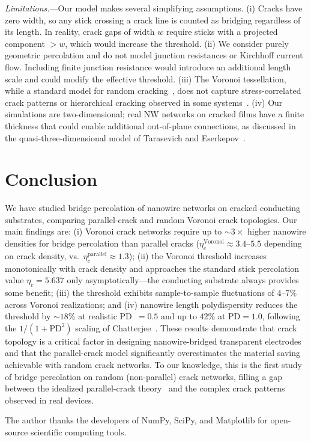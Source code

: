 \textit{Limitations.}---Our model makes several simplifying
assumptions.
(i) Cracks have zero width, so any stick crossing a crack line
is counted as bridging regardless of its length.
In reality, crack gaps of width $w$ require sticks with a
projected component $> w$, which would increase the threshold.
(ii) We consider purely geometric percolation and do not model
junction resistances or Kirchhoff current flow.
Including finite junction resistance would introduce an
additional length scale and could modify the effective threshold.
(iii) The Voronoi tessellation, while a standard model for
random cracking~\cite{Tarasevich2023}, does not capture
stress-correlated crack patterns or hierarchical cracking
observed in some systems~\cite{Bohn2005}.
(iv) Our simulations are two-dimensional; real NW networks on
cracked films have a finite thickness that could enable
additional out-of-plane connections, as discussed in the
quasi-three-dimensional model of
Tarasevich and Eserkepov~\cite{Tarasevich2026}.

\section{Conclusion}

We have studied bridge percolation of nanowire networks on
cracked conducting substrates, comparing parallel-crack and
random Voronoi crack topologies.
Our main findings are:
(i) Voronoi crack networks require up to $\sim 3\times$ higher
nanowire densities for bridge percolation than parallel cracks
($\eta_c^\mathrm{Voronoi} \approx 3.4$--$5.5$ depending on
crack density, vs.\ $\eta_c^\mathrm{parallel} \approx 1.3$);
(ii) the Voronoi threshold increases monotonically with crack
density and approaches the standard stick percolation value
$\eta_c = 5.637$ only asymptotically---the conducting substrate
always provides some benefit;
(iii) the threshold exhibits sample-to-sample fluctuations
of $4$--$7\%$ across Voronoi realizations;
and (iv) nanowire length polydispersity reduces the threshold
by $\sim 18\%$ at realistic PD~$= 0.5$ and up to $42\%$ at
$\mathrm{PD} = 1.0$, following the $1/(1+\mathrm{PD}^2)$
scaling of Chatterjee~\cite{Chatterjee2010}.
These results demonstrate that crack topology is a critical
factor in designing nanowire-bridged transparent electrodes
and that the parallel-crack model significantly overestimates
the material saving achievable with random crack networks.
To our knowledge, this is the first study of bridge percolation
on random (non-parallel) crack networks, filling a gap between
the idealized parallel-crack theory~\cite{Baret2024,Baret2025}
and the complex crack patterns observed in real devices.

\begin{acknowledgments}
The author thanks the developers of NumPy, SciPy,
and Matplotlib for open-source scientific computing tools.
\end{acknowledgments}
